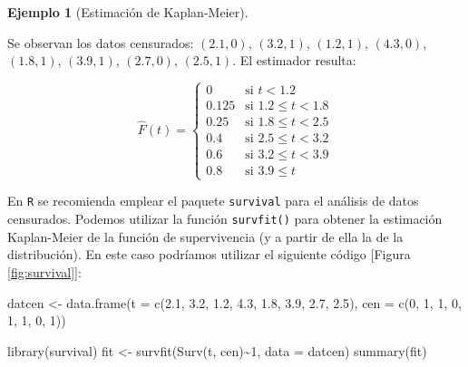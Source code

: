 \documentclass[
]{book}
\newenvironment{Shaded}{\begin{snugshade}}{\end{snugshade}}
\newcommand{\AttributeTok}[1]{\textcolor[rgb]{0.77,0.63,0.00}{#1}}
\newcommand{\DecValTok}[1]{\textcolor[rgb]{0.00,0.00,0.81}{#1}}
\newcommand{\FloatTok}[1]{\textcolor[rgb]{0.00,0.00,0.81}{#1}}
\newcommand{\FunctionTok}[1]{\textcolor[rgb]{0.00,0.00,0.00}{#1}}
\newcommand{\NormalTok}[1]{#1}
\newcommand{\OtherTok}[1]{\textcolor[rgb]{0.56,0.35,0.01}{#1}}
\newcommand{\SpecialCharTok}[1]{\textcolor[rgb]{0.00,0.00,0.00}{#1}}
\theoremstyle{break}
\theoremstyle{definition}
\theoremstyle{definition}
\newtheorem{example}{Ejemplo}[chapter]
\theoremstyle{definition}
\theoremstyle{definition}
\theoremstyle{remark}
\begin{document}
\begin{example}[Estimación de Kaplan-Meier]
\protect\hypertarget{exm:kaplan-meier}{}{\label{exm:kaplan-meier} \iffalse (Estimación de Kaplan-Meier) \fi{} }
\vspace{0.5cm}

Se observan los datos censurados: \(\left( 2.1,0 \right)\),
\(\left(3.2,1 \right)\), \(\left( 1.2,1 \right)\), \(\left( 4.3,0 \right)\), \(\left( 1.8,1 \right)\), \(\left( 3.9,1 \right)\), \(\left( 2.7,0 \right)\), \(\left( 2.5,1 \right)\). El estimador resulta:

\[\hat{F}\left( t \right) =\left\{ 
\begin{array}{ll}
0& \text{si } t<1.2 \\ 
0.125& \text{si } 1.2\leq t<1.8 \\ 
0.25& \text{si } 1.8\leq t<2.5 \\ 
0.4& \text{si } 2.5\leq t<3.2 \\ 
0.6& \text{si } 3.2\leq t<3.9 \\ 
0.8& \text{si } 3.9\leq t
\end{array}
\right.\]
\end{example}

En \texttt{R} se recomienda emplear el paquete \texttt{survival} para el análisis de
datos censurados. Podemos utilizar la función \texttt{survfit()} para obtener
la estimación Kaplan-Meier de la función de supervivencia
(y a partir de ella la de la distribución).
En este caso podríamos utilizar el siguiente código {[}Figura \ref{fig:survival}{]}:

\begin{Shaded}
\begin{Highlighting}[]
\NormalTok{datcen }\OtherTok{\textless{}{-}} \FunctionTok{data.frame}\NormalTok{(}\AttributeTok{t =} \FunctionTok{c}\NormalTok{(}\FloatTok{2.1}\NormalTok{, }\FloatTok{3.2}\NormalTok{, }\FloatTok{1.2}\NormalTok{, }\FloatTok{4.3}\NormalTok{, }\FloatTok{1.8}\NormalTok{, }\FloatTok{3.9}\NormalTok{, }\FloatTok{2.7}\NormalTok{, }\FloatTok{2.5}\NormalTok{), }
                 \AttributeTok{cen =} \FunctionTok{c}\NormalTok{(}\DecValTok{0}\NormalTok{, }\DecValTok{1}\NormalTok{, }\DecValTok{1}\NormalTok{, }\DecValTok{0}\NormalTok{, }\DecValTok{1}\NormalTok{, }\DecValTok{1}\NormalTok{, }\DecValTok{0}\NormalTok{, }\DecValTok{1}\NormalTok{))}

\FunctionTok{library}\NormalTok{(survival)}
\NormalTok{fit }\OtherTok{\textless{}{-}} \FunctionTok{survfit}\NormalTok{(}\FunctionTok{Surv}\NormalTok{(t, cen)}\SpecialCharTok{\textasciitilde{}}\DecValTok{1}\NormalTok{, }\AttributeTok{data =}\NormalTok{ datcen)}
\FunctionTok{summary}\NormalTok{(fit)}
\end{Highlighting}
\end{Shaded}
\end{document}

